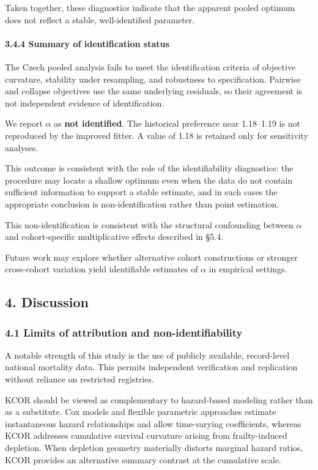 \documentclass[
]{article}
\begin{document}
Taken together, these diagnostics indicate that the apparent pooled optimum does not reflect a stable, well-identified parameter.

\paragraph{3.4.4 Summary of identification status}\label{summary-of-identification-status}

The Czech pooled analysis fails to meet the identification criteria of objective curvature, stability under resampling, and robustness to specification. Pairwise and collapse objectives use the same underlying residuals, so their agreement is not independent evidence of identification.

We report \(\alpha\) as \textbf{not identified}. The historical preference near 1.18--1.19 is not reproduced by the improved fitter. A value of 1.18 is retained only for sensitivity analyses.

This outcome is consistent with the role of the identifiability diagnostics: the procedure may locate a shallow optimum even when the data do not contain sufficient information to support a stable estimate, and in such cases the appropriate conclusion is non-identification rather than point estimation.

This non-identification is consistent with the structural confounding between \(\alpha\) and cohort-specific multiplicative effects described in §5.4.

Future work may explore whether alternative cohort constructions or stronger cross-cohort variation yield identifiable estimates of \(\alpha\) in empirical settings.

\subsection{4. Discussion}\label{discussion}

\subsubsection{4.1 Limits of attribution and non-identifiability}\label{limits-of-attribution-and-non-identifiability}

A notable strength of this study is the use of publicly available, record-level national mortality data. This permits independent verification and replication without reliance on restricted registries.

KCOR should be viewed as complementary to hazard-based modeling rather than as a substitute. Cox models and flexible parametric approaches estimate instantaneous hazard relationships and allow time-varying coefficients, whereas KCOR addresses cumulative survival curvature arising from frailty-induced depletion. When depletion geometry materially distorts marginal hazard ratios, KCOR provides an alternative summary contrast at the cumulative scale.
\end{document}
